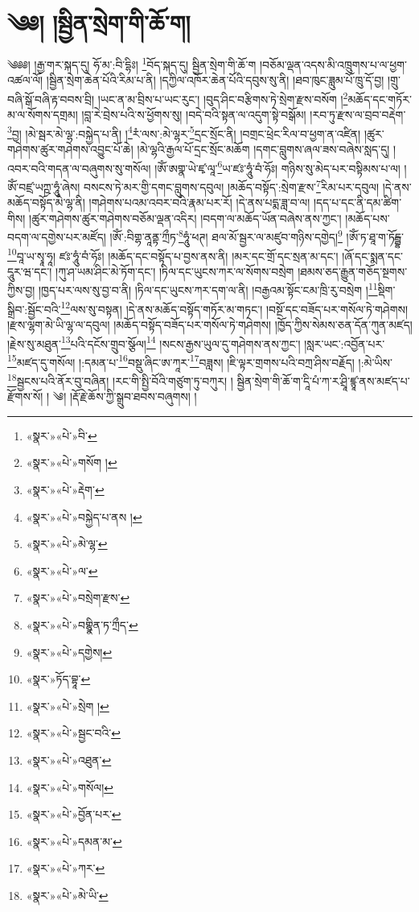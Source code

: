 \chapter{༄༅། །སྦྱིན་སྲེག་གི་ཆོ་ག།}༄༅༅། །རྒྱ་གར་སྐད་དུ། ཧོ་མ་:བི་དྷིཿ། \footnote{«སྣར་»«པེ་»བི་}བོད་སྐད་དུ། སྦྱིན་སྲེག་གི་ཆོ་ག །བཅོམ་ལྡན་འདས་མི་འཁྲུགས་པ་ལ་ཕྱག་འཚལ་ལོ། །སྦྱིན་སྲེག་ཆེན་པོའི་རིམ་པ་ནི། །དཀྱིལ་འཁོར་ཆེན་པོའི་དབུས་སུ་ནི། །ཐབ་ཁུང་ཟླུམ་པོ་ཁྲུ་དོ་བྱ། །གྲུ་བཞི་སྒོ་བཞི་རྟ་བབས་བྲི། །ཡང་ན་མ་བྲིས་པ་ཡང་རུང་། །བུད་ཤིང་བརྩིགས་ཏེ་སྲེག་རྫས་བསོག །\footnote{«སྣར་»«པེ་»གསོག །}མཆོད་དང་གཏོར་མ་ལ་སོགས་དགྲམ། །བླ་རེ་བྲེས་པའི་ས་ཕྱོགས་སུ། །བདེ་བའི་སྟན་ལ་འདུག་སྟེ་བསྒོམ། །རབ་ཏུ་རྫས་ལ་བྲབ་བརྡེག་\footnote{«སྣར་»«པེ་»རྡེག་}བྱ། །མེ་སྦར་མེ་ལྷ་:བསྐྱེད་པ་ནི། །\footnote{«སྣར་»«པེ་»བསྐྱེད་པ་ནས །}རཾ་ལས་:མེ་ལྷར་\footnote{«སྣར་»«པེ་»མེ་ལྷ་}དྲང་སྲོང་ནི། །བགྲང་ཕྲེང་རིལ་བ་ཕྱག་ན་འཛིན། །ཚུར་གཤེགས་ཚུར་གཤེགས་འབྱུང་པོ་ཆེ། །མེ་ལྷའི་རྒྱལ་པོ་དྲང་སྲོང་མཆོག །དགང་བླུགས་ཞལ་ཟས་བཞེས་སླད་དུ། །འབར་བའི་གདན་ལ་བཞུགས་སུ་གསོལ། །ཨོཾ་ཨགྣ་ཡེ་ཛྭ་ལཱ་\footnote{«སྣར་»«པེ་»ལ་}ཡ་ཛཿ་ཧཱུཾ་བཾ་ཧོཿ། གཉིས་སུ་མེད་པར་བསྟིམས་པ་ལ། །ཨོཾ་བཛྲ་ཡཀྵ་ཧཱུཾ་ཞེས། བསངས་ཏེ་མར་གྱི་དགང་བླུགས་དབུལ། །མཆོད་བསྟོད་:སྲེག་རྫས་\footnote{«སྣར་»«པེ་»བསྲེག་རྫས་}རིམ་པར་དབུལ། །དེ་ནས་མཆོད་བསྟོད་མེ་ལྷ་ནི། །གཤེགས་པའམ་འབར་བའི་རྣམ་པར་རོ། །དེ་ནས་པདྨ་ཟླ་བ་ལ། །དད་པ་དང་ནི་དམ་ཚིག་གིས། །ཚུར་གཤེགས་ཚུར་གཤེགས་བཅོམ་ལྡན་འདིར། །བདག་ལ་མཆོད་ཡོན་བཞེས་ནས་ཀྱང་། །མཆོད་པས་བདག་ལ་དགྱེས་པར་མཛོད། །ཨོཾ་:བིགྷ་ནཱནྟ་ཀྲྀཏ་\footnote{«སྣར་»«པེ་»བགྷྣིན་ཏ་ཀྲྀད་}ཧཱུཾ་ཕཊ། ཐལ་མོ་སྦྱར་ལ་མཛུབ་གཉིས་དགྱེད།\footnote{«སྣར་»«པེ་»དགྱེས།} །ཨོཾ་ཏ་ཐཱ་ག་ཏོངྦྷ་\footnote{«སྣར་»ཏོད་བྷཱ་}བཱ་ཡ་སྭཱ་ཧཱ། ཛཿ་ཧཱུཾ་བཾ་ཧོཿ། །མཆོད་དང་བསྟོད་པ་བྱས་ནས་ནི། །མར་དང་གྲོ་དང་སྲན་མ་དང་། །ཞོ་དང་སྨན་དང་དཱུར་ཝ་དང་། །ཀུ་ཤ་ཡམ་ཤིང་མེ་ཏོག་དང་། །ཏིལ་དང་ཡུངས་ཀར་ལ་སོགས་བསྲེག །ཐམས་ཅད་རྒྱུན་གཅོད་སྔགས་ཀྱིས་བྱ། །ཁྱད་པར་ལས་སུ་བྱ་བ་ནི། །ཏིལ་དང་ཡུངས་ཀར་དག་ལ་ནི། །བརྒྱའམ་སྟོང་ངམ་ཁྲི་རུ་བསྲེག །\footnote{«སྣར་»«པེ་»སྲེག །}སྡིག་སྒྲིབ་:སྦྱོང་བའི་\footnote{«སྣར་»«པེ་»སྦྱང་བའི་}ལས་སུ་བསྟན། །དེ་ནས་མཆོད་བསྟོད་གཏོར་མ་གཏང་། །བསྔོ་དང་བཟོད་པར་གསོལ་ཏེ་གཤེགས། །རྫས་ལྷག་མེ་ཡི་ལྷ་ལ་དབུལ། །མཆོད་བསྟོད་བཟོད་པར་གསོལ་ཏེ་གཤེགས། །ཁྱོད་ཀྱིས་སེམས་ཅན་དོན་ཀུན་མཛད། །རྗེས་སུ་མཐུན་\footnote{«སྣར་»«པེ་»འཐུན་}པའི་དངོས་གྲུབ་སྩོལ།\footnote{«སྣར་»«པེ་»གསོལ།} །སངས་རྒྱས་ཡུལ་དུ་གཤེགས་ནས་ཀྱང་། །སླར་ཡང་:འབྱོན་པར་\footnote{«སྣར་»«པེ་»བྱོན་པར་}མཛད་དུ་གསོལ། །:དམན་པ་\footnote{«སྣར་»«པེ་»དམན་མ་}བསྡུ་ཞིང་ཨ་ཀཱར་\footnote{«སྣར་»«པེ་»ཀར་}བཟླས། །ཇི་ལྟར་གྲགས་པའི་བཀྲ་ཤིས་བརྗོད། །:མེ་ཡིས་\footnote{«སྣར་»«པེ་»མེ་ཡི་}སྦྱངས་པའི་ནོར་བུ་བཞིན། །རང་གི་སྤྱི་བོའི་གཙུག་ཏུ་བཀུར། །
སྦྱིན་སྲེག་གི་ཆོ་ག་དཱི་པཾ་ཀ་ར་ཤྲཱི་ཛྙཱ་ནས་མཛད་པ་རྫོགས་སོ། ། ༄། །རྡོ་རྗེ་ཆོས་ཀྱི་སྒྲུབ་ཐབས་བཞུགས། །